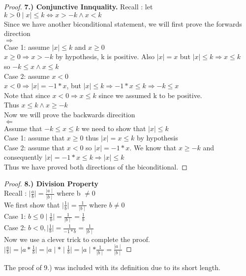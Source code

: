 \documentclass[12pt]{article}
\theoremstyle{definition}
\begin{document}
\begin{proof}
  \textbf{7.) Conjunctive Innquality.}
Recall : let $k > 0 \mid x \mid \le k \iff x > -k \land x < k $\\
 
Since we have another biconditional statement, we will first prove the forwards direction\\
$\Rightarrow$\\
Case 1: assume $\mid x \mid \le k$ and $x \ge 0$\\
$x \ge 0 \Rightarrow x > -k$ by hypothesis, k is positive. Also $\mid x \mid = x$ but $ \mid x \mid \le k \Rightarrow x \le k$\\
so $ -k \le x \land x \le k$\\
Case 2: assume $x < 0$\\
$x < 0 \Rightarrow \mid x \mid = -1 * x$, but $\mid x \mid \le k \Rightarrow -1 * x \le k \Rightarrow -k \le x$\\
Note that since $x < 0 \Rightarrow x \le k $ since we assumed k to be positive.\\
Thus $x \le k \land x \ge -k $\\
Now we will prove the backwards direcition\\
$\Leftarrow$\\
Assume that $-k \le x \le k$ we need to show that $\mid x \mid \le k$\\
Case 1: assume that $x \ge 0$ thus $\mid x \mid = x \le k$ by hypothesis\\
Case 2: assume that $ x < 0$ so $\mid x \mid = -1 * x$. We know that $x \ge -k$ and consequently $\mid x \mid = -1*x \le k \Rightarrow \mid x \mid \le k$\\

Thus we have proved both directions of the biconditional.

\end{proof}

\begin{proof}
  \textbf{8.) Division Property}\\
Recall : $\mid \frac{a}{b} \mid = \frac{\mid a \mid}{\mid b \mid} $ where b $\ne 0$\\
We first show that $\mid \frac{1}{b} \mid = \frac{1}{\mid b \mid}$ where $b \ne 0$\\
Case 1: $ b \le 0 \mid \frac{1}{b} \mid = \frac{1}{\mid b \mid} = \frac{1}{b}$\\
Case 2: $b < 0, \mid \frac{1}{b} \mid = \frac{1}{-1*b} = \frac{1}{\mid b \mid} $\\

Now we use a clever trick to complete the proof.\\
$\mid \frac{a}{b} \mid = \mid a * \frac{1}{b} \mid = \mid a \mid * \mid \frac{1}{b} \mid = \mid a \mid * \frac{1}{\mid b \mid} = \frac{\mid a \mid}{\mid b \mid} $
\end{proof}
The proof of 9.) was included with its definition due to its short length.
\end{document}
